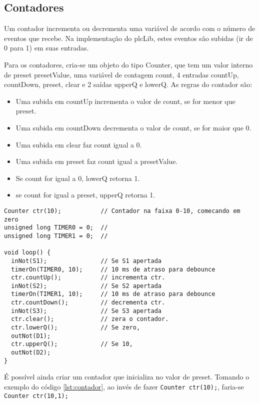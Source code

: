 \subsection{Contadores}
Um contador incrementa ou decrementa uma variável de acordo com o número de eventos que recebe. Na implementação do plcLib, estes eventos são subidas (ir de 0 para 1) em suas entradas.

Para os contadores, cria-se um objeto do tipo Counter, que tem um valor interno de preset presetValue, uma variável de contagem count, 4 entradas countUp, countDown, preset, clear e 2 saídas upperQ e lowerQ. As regras do contador são:
\begin{itemize}
  \item Uma subida em countUp incrementa o valor de count, se for menor que preset.
  \item Uma subida em countDown decrementa o valor de count, se for maior que 0.
  \item Uma subida em clear faz count igual a 0.
  \item Uma subida em preset faz count igual a presetValue.
  \item Se count for igual a 0, lowerQ retorna 1.
  \item se count for igual a preset, upperQ retorna 1.
\end{itemize}
\begin{lstlisting}[caption=Exemplo de uso do contador., label=lst:contador]
Counter ctr(10);           // Contador na faixa 0-10, comecando em zero
unsigned long TIMER0 = 0;  // 
unsigned long TIMER1 = 0;  // 

void loop() {
  inNot(S1);               // Se S1 apertada
  timerOn(TIMER0, 10);     // 10 ms de atraso para debounce
  ctr.countUp();           // incrementa ctr.
  inNot(S2);               // Se S2 apertada
  timerOn(TIMER1, 10);     // 10 ms de atraso para debounce
  ctr.countDown();         // decrementa ctr.
  inNot(S3);               // Se S3 apertada
  ctr.clear();             // zera o contador.
  ctr.lowerQ();            // Se zero,
  outNot(D1);
  ctr.upperQ();            // Se 10,
  outNot(D2);
}
\end{lstlisting}
É possível ainda criar um contador que inicializa no valor de preset. Tomando o exemplo do código \ref{lst:contador}, ao invés de fazer \lstinline|Counter ctr(10);|, faria-se \lstinline|Counter ctr(10,1);|
